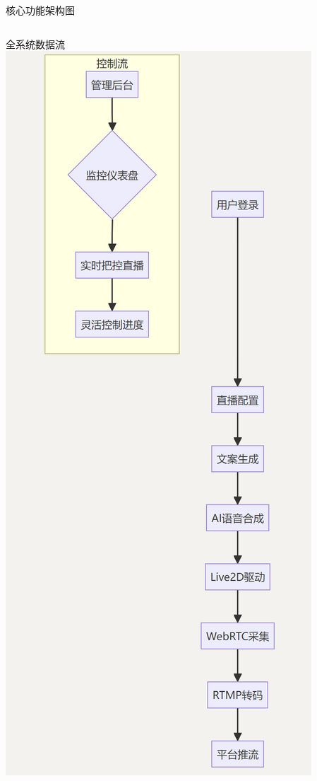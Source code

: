 \documentclass{beamer}
\begin{document}
\begin{frame}{核心功能架构图}
    \begin{columns}[T]
        \begin{column}{0.5\textwidth}
            \begin{block}{全系统数据流}
                \includegraphics[height=0.7\textheight]{pic/data_flow.png}

\end{block}
\end{column}
\end{columns}
\end{frame}
\end{document}
